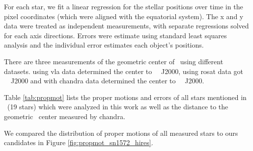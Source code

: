 For each star, we fit a linear regression for the stellar positions over time in the pixel coordinates (which were aligned with the equatorial system). The x and y data were treated as independent measurements, with separate regressions solved for each axis directions. Errors were estimate using standard least squares analysis and the individual error estimates each object's positions.

There are three measurements of the geometric center of \ using different datasets. \cite{1997ApJ...491..816R} using \gls{vla} data determined the center to \ \ J2000,  \citet{2000ApJ...545L..53H} using \gls{rosat} data got \  \ J2000 and \cite{2005ApJ...634..376W} with \gls{chandra} data determined the center to \ \ J2000. 

 Table \ref{tab:propmot} lists the proper motions and errors of all stars mentioned in \rl\ (19 stars) which were analyzed in this work as well as the distance to the geometric \xray\ center measured by \gls{chandra}.

We compared the distribution of proper motions of all measured stars to ours candidates in Figure \ref{fig:propmot_sn1572_hires}.

